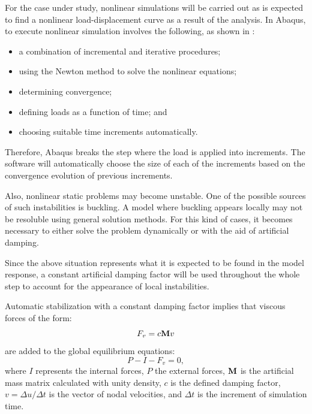     For the case under study, nonlinear simulations will be carried out as is expected to find a nonlinear load-displacement curve as a result of the analysis. In Abaqus, to execute nonlinear simulation involves the following, as shown in \cite{Abaqus}:

    \begin{itemize}
      \item a combination of incremental and iterative procedures;
      \item using the Newton method to solve the nonlinear equations;
      \item determining convergence;
      \item defining loads as a function of time; and
      \item choosing suitable time increments automatically.
    \end{itemize}

    Therefore, Abaqus breaks the step where the load is applied into increments. The software will automatically choose the size of each of the increments based on the convergence evolution of previous increments.

    Also, nonlinear static problems may become unstable. One of the possible sources of such instabilities is buckling. A model where buckling appears locally may not be resoluble using general solution methods. For this kind of cases, it becomes necessary to either solve the problem dynamically or with the aid of artificial damping.

    Since the above situation represents what it is expected to be found in the model response, a constant artificial damping factor will be used throughout the whole step to account for the appearance of local instabilities.

    Automatic stabilization with a constant damping factor implies that viscous forces of the form:
    \begin{equation}
      F_v = c \mathrm{\textbf{M}} v
    \end{equation}
    are added to the global equilibrium equations:
    \begin{equation}
      P - I - F_v = 0,
    \end{equation}
    where $I$ represents the internal forces, $P$ the external forces, $\mathrm{\textbf{M}}$ is the artificial mass matrix calculated with unity density, $c$ is the defined damping factor, $v = \Delta u / \Delta t$ is the vector of nodal velocities, and $\Delta t$ is the increment of simulation time.

